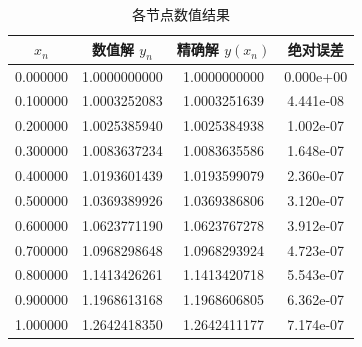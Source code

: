 \begin{table}[H]
  \centering
  \caption{各节点数值结果}
  \begin{tabular}{cccc}
    \toprule
    $x_n$ & 数值解 $y_n$ & 精确解 $y(x_n)$ & 绝对误差 \\
    \midrule
    0.000000 & 1.0000000000 & 1.0000000000 & 0.000e+00 \\
    0.100000 & 1.0003252083 & 1.0003251639 & 4.441e-08 \\
    0.200000 & 1.0025385940 & 1.0025384938 & 1.002e-07 \\
    0.300000 & 1.0083637234 & 1.0083635586 & 1.648e-07 \\
    0.400000 & 1.0193601439 & 1.0193599079 & 2.360e-07 \\
    0.500000 & 1.0369389926 & 1.0369386806 & 3.120e-07 \\
    0.600000 & 1.0623771190 & 1.0623767278 & 3.912e-07 \\
    0.700000 & 1.0968298648 & 1.0968293924 & 4.723e-07 \\
    0.800000 & 1.1413426261 & 1.1413420718 & 5.543e-07 \\
    0.900000 & 1.1968613168 & 1.1968606805 & 6.362e-07 \\
    1.000000 & 1.2642418350 & 1.2642411177 & 7.174e-07 \\
    \bottomrule
  \end{tabular}
\end{table}